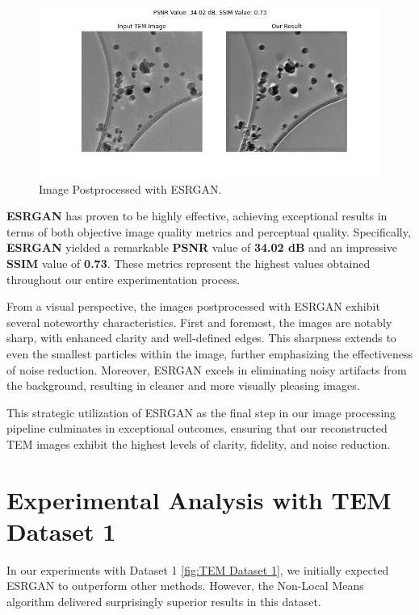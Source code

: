 \begin{figure}[H]
\centering
\includegraphics[width=.9\textwidth]{img/Dataset_3_with_ESRGAN.jpg}
\caption{Image Postprocessed with ESRGAN.}\label{fig:Dataset_3_ESRGAN}
\end{figure}

\vspace{10pt}

\textbf{ESRGAN} has proven to be highly effective, achieving exceptional results in terms of both objective image quality metrics and perceptual quality. Specifically, \textbf{ESRGAN} yielded a remarkable \textbf{PSNR} value of \textbf{34.02 dB} and an impressive \textbf{SSIM} value of\textbf{ 0.73}. These metrics represent the highest values obtained throughout our entire experimentation process.

\vspace{10pt}

From a visual perspective, the images postprocessed with ESRGAN exhibit several noteworthy characteristics. First and foremost, the images are notably sharp, with enhanced clarity and well-defined edges. This sharpness extends to even the smallest particles within the image, further emphasizing the effectiveness of noise reduction. Moreover, ESRGAN excels in eliminating noisy artifacts from the background, resulting in cleaner and more visually pleasing images.

\vspace{10pt}

This strategic utilization of ESRGAN as the final step in our image processing pipeline culminates in exceptional outcomes, ensuring that our reconstructed TEM images exhibit the highest levels of clarity, fidelity, and noise reduction.


\clearpage
\section{Experimental Analysis with TEM Dataset 1}
In our experiments with Dataset 1 \ref{fig:TEM Dataset 1}, we initially expected ESRGAN to outperform other methods. However, the Non-Local Means algorithm delivered surprisingly superior results in this dataset.

